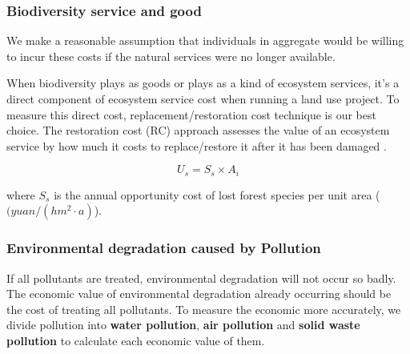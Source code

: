\documentclass{mcmthesis}
\begin{document}
				
				\subsubsection{Biodiversity service and good}
				
					We make a reasonable assumption that individuals in aggregate would be willing to incur these costs if the natural services were no longer available.
					
					When biodiversity plays as goods or plays as a kind of ecosystem services, it’s a direct component of ecosystem service cost when running a land use project. To measure this direct cost, replacement/restoration cost technique is our best choice. The restoration cost (RC) approach assesses the value of an ecosystem service by how much it costs to replace/restore it after it has been damaged \cite{garrod1999economic}.
					
					\begin{equation}
						U _ { s } = S _ { s } \times A _ { i }
					\end{equation}
					
					\noindent
					where $S_s$ is the annual opportunity cost of lost forest species per unit area ($(yuan/(hm^2·a)$).
					
			\subsubsection{Environmental degradation caused by Pollution}
				
				If all pollutants are treated, environmental degradation will not occur so badly. The economic value of environmental degradation already occurring should be the cost of treating all pollutants. To measure the economic more accurately, we divide pollution into \textbf{water pollution}, \textbf{air pollution} and \textbf{solid waste pollution} to calculate each economic value of them.
				
\end{document}
